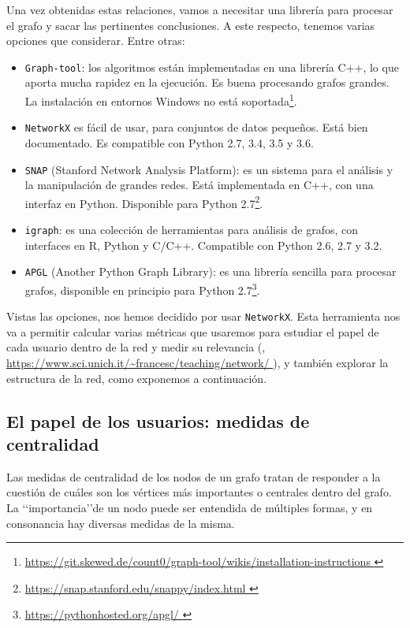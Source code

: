Una vez obtenidas estas relaciones, vamos a necesitar una librería 
para procesar el grafo y sacar las pertinentes 
conclusiones. A este respecto, tenemos varias opciones que 
considerar. Entre otras:
\begin{itemize}
\item {\tt Graph-tool}: los algoritmos están implementadas en una librería C++, 
lo que aporta mucha rapidez en la ejecución. Es 
buena procesando grafos grandes. La instalación en entornos Windows no
está soportada\footnote{\url{https://git.skewed.de/count0/graph-tool/wikis/installation-instructions 
}}.
\item {\tt NetworkX} es fácil de usar, para conjuntos de datos pequeños. Está bien
documentado. Es compatible con Python 2.7, 3.4, 3.5 y 3.6.
\item {\tt SNAP} (Stanford Network Analysis Platform): es un sistema para el análisis
y la manipulación de grandes redes. Está implementada en C++, con una interfaz en Python. 
Disponible para Python 2.7\footnote{\url{https://snap.stanford.edu/snappy/index.html }}.
\item {\tt igraph}: es una colección de herramientas para análisis de grafos,
con interfaces en R, Python y C/C++. Compatible con Python 2.6, 2.7 y 3.2.
\item {\tt APGL} (Another Python Graph Library): es una librería sencilla
para procesar grafos, disponible en principio para Python 2.7\footnote{\url{https://pythonhosted.org/apgl/ }}.
\end{itemize}

Vistas las opciones, nos hemos decidido por usar {\tt NetworkX}.
Esta herramienta nos va a permitir calcular varias métricas
que usaremos para estudiar el papel de cada usuario dentro de la red
y medir su relevancia (\cite{notas_fernando}, \url{https://www.sci.unich.it/~francesc/teaching/network/ }), y también explorar la estructura de la red, como exponemos a continuación.

\subsection{El papel de los usuarios: medidas de centralidad}

Las medidas de centralidad de los nodos de un grafo tratan de responder a la
cuestión de cuáles son los vértices más importantes o centrales dentro del 
grafo. La \lq\lq importancia\rq\rq de un nodo puede ser entendida 
de múltiples formas, y en consonancia hay diversas medidas de la misma.

